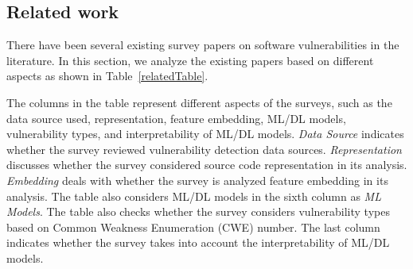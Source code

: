 



\subsection{Related work}
There have been several existing survey papers on software vulnerabilities in the literature. In this section, we analyze the existing papers based on different aspects as shown in Table~\ref{relatedTable}.



The columns in the table represent different aspects of the surveys, such as the data source used, representation, feature embedding, ML/DL models, vulnerability types, and interpretability of ML/DL models. \textit{Data Source} indicates whether the survey reviewed vulnerability detection data sources. \textit{Representation} discusses whether the survey considered source code representation in its analysis. \textit{Embedding} deals with whether the survey is analyzed feature embedding in its analysis. The table also considers ML/DL models in the sixth column as \textit{ML Models}. The table also checks whether the survey considers vulnerability types based on Common Weakness Enumeration (CWE) number. The last column indicates whether the survey takes into account the interpretability of ML/DL models.%

